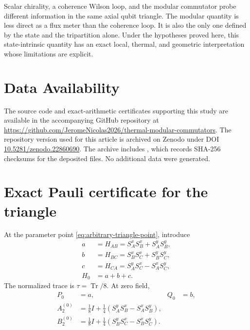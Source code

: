 \documentclass[aps,prb,preprint,nofootinbib,longbibliography]{revtex4-2}
\newcommand{\Tr}{\operatorname{Tr}}
\begin{document}
Scalar chirality, a coherence Wilson loop, and the modular commutator probe
different information in the same axial qubit triangle.  The modular quantity
is less direct as a flux meter than the coherence loop.  It is also the only
one defined by the state and the tripartition alone.  Under the hypotheses
proved here,
this state-intrinsic quantity has an exact local, thermal, and geometric
interpretation whose limitations are explicit.

\section*{Data Availability}

The source code and exact-arithmetic certificates supporting this study are
available in the accompanying GitHub repository at
\url{https://github.com/JeromeNicolas2026/thermal-modular-commutators}.
The repository version used for this article is archived on Zenodo under DOI
\href{https://doi.org/10.5281/zenodo.22860690}{10.5281/zenodo.22860690}.
The archive includes
, which records SHA-256 checksums for the deposited
files.  No additional data were generated.

\appendix

\section{Exact Pauli certificate for the triangle}
\label{app:pauli-certificate}

At the parameter point \eqref{eq:arbitrary-triangle-point}, introduce
\begin{align}
 a&=H_{AB}=S_A^xS_B^x+S_A^yS_B^y,
 \label{eq:a-def}\\
 b&=H_{BC}=S_B^xS_C^x+S_B^yS_C^y,
 \label{eq:b-def}\\
 c&=H_{CA}=S_A^yS_C^x-S_A^xS_C^y,
 \label{eq:c-def}\\
 H_0&=a+b+c.
 \label{eq:H0-def}
\end{align}
The normalized trace is $\tau=\Tr/8$.  At zero field,
\begin{align}
 P_0&=a,
 &Q_0&=b,
 \label{eq:P0Q0}\\
 A_2^{(0)}
 &=\frac18I+\frac14(S_A^yS_B^x-S_A^xS_B^y),
 \label{eq:A20}\\
 B_2^{(0)}
 &=\frac18I+\frac14(S_B^yS_C^x-S_B^xS_C^y).
 \label{eq:B20}
\end{align}
\end{document}
